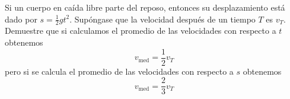 \item Si un cuerpo en caída libre parte del reposo, entonces su desplazamiento está dado por $s = \frac{1}{2} gt^2$. Supóngase que la velocidad después de un tiempo $T$ es $v_T$. Demuestre que si calculamos el promedio de las velocidades con respecto a $t$ obtenemos
$$v_{\text{med}} = \frac{1}{2} v_T$$
pero si se calcula el promedio de las velocidades con respecto a $s$ obtenemos
$$v_{\text{med}} = \frac{2}{3} v_T$$
